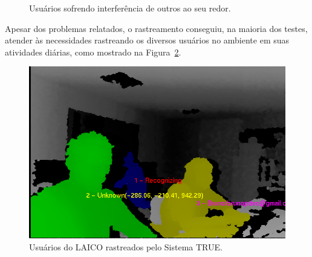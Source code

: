 	\begin{figure}[htb]
		\begin{center}
		\end{center}
		\caption{Usuários sofrendo interferência de outros ao seu redor.}
		\label{fig:testes_relacionamento_com_usuarios}
	\end{figure}

	Apesar dos problemas relatados, o rastreamento conseguiu, na maioria dos testes,
	atender às necessidades rastreando os diversos usuários no ambiente em suas
	atividades diárias, como mostrado na Figura~\ref{fig:varios-usuarios-ambiente}.

	\begin{figure}[htb]
		\begin{center}
			\includegraphics[scale=0.5]{figuras/5.Testes/oclusao/usuarios-rastreados.png}
		\end{center}
		\caption{Usuários do LAICO rastreados pelo Sistema TRUE.}
		\label{fig:varios-usuarios-ambiente}
	\end{figure}	